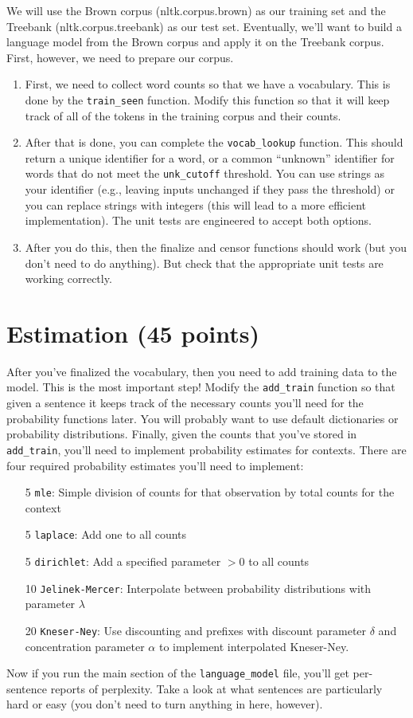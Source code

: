 \documentclass[11pt]{article}
\begin{document}
We will use the Brown corpus (nltk.corpus.brown) as our training set and the Treebank (nltk.corpus.treebank) as our test set.  Eventually, we'll want to build a language model from the Brown corpus and apply it on the Treebank corpus.  First, however, we need to prepare our corpus.
\begin{enumerate}
\item First, we need to collect word counts so that we have a vocabulary.  This is done by the \texttt{train\_seen} function.  Modify this function so that it will keep track of all of the tokens in the training corpus and their counts.
\item After that is done, you can complete the \texttt{vocab\_lookup} function.  This should return a unique identifier for a word, or a common ``unknown'' identifier for words that do not meet the \texttt{unk\_cutoff} threshold.  You can use strings as your identifier (e.g., leaving inputs unchanged if they pass the threshold) or you can replace strings with integers (this will lead to a more efficient implementation).  The unit tests are engineered to accept both options.
\item After you do this, then the finalize and censor functions should work (but you don't need to do anything).  But check that the appropriate unit tests are working correctly.
\end{enumerate}

\section{Estimation (45 points)}

After you've finalized the vocabulary, then you need to add training data to the model.  This is the most important step!  Modify the \texttt{add\_train} function so that given a sentence it keeps track of the necessary counts you'll need for the probability functions later.  You will probably want to use default dictionaries or probability distributions.  Finally, given the counts that you've stored in \texttt{add\_train}, you'll need to implement probability estimates for contexts.  There are four required probability estimates you'll need to implement:
\begin{itemize}
\item[5] \texttt{mle}: Simple division of counts for that observation by total counts for the context
\item[5] \texttt{laplace}: Add one to all counts
\item[5] \texttt{dirichlet}: Add a specified parameter $> 0$ to all counts
\item[10] \texttt{Jelinek-Mercer}: Interpolate between probability distributions with parameter $\lambda$
\item[20] \texttt{Kneser-Ney}: Use discounting and prefixes with
  discount parameter $\delta$ and concentration parameter $\alpha$ to
  implement interpolated Kneser-Ney.
\end{itemize}
Now if you run the main section of the \texttt{language\_model} file, you'll get per-sentence reports of perplexity.  Take a look at what sentences are particularly hard or easy (you don't need to turn anything in here, however).
\end{document}
